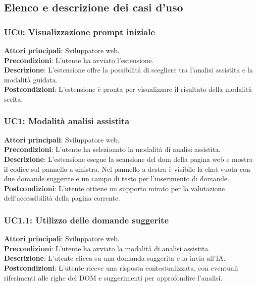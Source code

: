 \subsection{Elenco e descrizione dei casi d'uso}
\subsubsection*{UC0: Visualizzazione prompt iniziale}
\noindent \textbf{Attori principali}: Sviluppatore web.\\
\textbf{Precondizioni}: L'utente ha avviato l’estensione.\\
\textbf{Descrizione}: L’estensione offre la possibilità di scegliere tra l’analisi assistita e la modalità guidata.\\
\textbf{Postcondizioni}: L’estensione è pronta per visualizzare il risultato della modalità scelta.\\

\subsubsection*{UC1: Modalità analisi assistita}
\noindent \textbf{Attori principali}: Sviluppatore web.\\
\textbf{Precondizioni}: L’utente ha selezionato la modalità di analisi assistita.\\
\textbf{Descrizione}: L’estensione esegue la scansione del \acrshort{dom} della pagina web e mostra il codice sul pannello a sinistra. Nel pannello a destra è visibile la chat vuota con due domande suggerite e un campo di testo per l'inserimento di domande.\\
\textbf{Postcondizioni}: L’utente ottiene un supporto mirato per la valutazione dell’accessibilità della pagina corrente.\\

\subsubsection*{UC1.1: Utilizzo delle domande suggerite}
\noindent \textbf{Attori principali}: Sviluppatore web.\\
\textbf{Precondizioni}: L’utente ha avviato la modalità di analisi assistita.\\
\textbf{Descrizione}: L’utente clicca su una domanda suggerita e la invia all'IA.\\
\textbf{Postcondizioni}: L’utente riceve una risposta contestualizzata, con eventuali riferimenti alle righe del DOM e suggerimenti per approfondire l’analisi.

